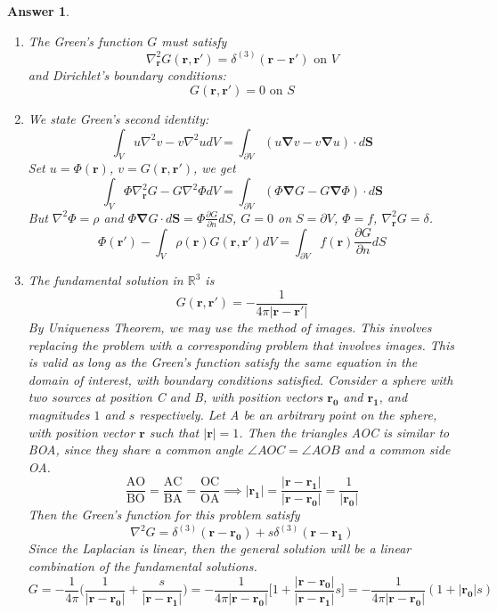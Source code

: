 \documentclass[a4paper]{article}
\newtheorem{ans}{Answer}[section]
\theoremstyle{new}
\begin{document}
\begin{ans}\leavevmode
\begin{enumerate}[label=(\alph*)]
\item The Green's function $G$ must satisfy
$$\nabla_{\mathbf{r}}^2G(\mathbf{r},\mathbf{r'})=\delta^{(3)}(\mathbf{r}-\mathbf{r'})\text{ on }V$$
and Dirichlet's boundary conditions:
$$G(\mathbf{r},\mathbf{r'})=0\text{ on }S$$
\item We state Green's second identity:
$$\int_Vu\nabla^2v-v\nabla^2udV=\int_{\partial V}(u\boldsymbol{\nabla}v-v\boldsymbol{\nabla}u)\cdot d\mathbf{S}$$
Set $u=\Phi(\mathbf{r})$, $v=G(\mathbf{r},\mathbf{r'})$, we get
$$\int_V\Phi\nabla_{\mathbf{r}}^2G-G\nabla^2\Phi dV=\int_{\partial V}(\Phi\boldsymbol{\nabla}G-G\boldsymbol{\nabla}\Phi)\cdot d\mathbf{S}$$
But $\nabla^2\Phi=\rho$ and $\Phi\boldsymbol{\nabla}G\cdot d\mathbf{S}=\Phi\frac{\partial G}{\partial n}dS$, $G=0$ on $S=\partial V$, $\Phi=f$, $\nabla_{\mathbf{r}}^2G=\delta$.
$$\Phi(\mathbf{r'})-\int_V\rho(\mathbf{r})G(\mathbf{r},\mathbf{r'})dV=\int_{\partial V}f(\mathbf{r})\frac{\partial G}{\partial n}dS$$
\item The fundamental solution in $\mathbb{R}^3$ is $$G(\mathbf{r},\mathbf{r'})=-\frac{1}{4\pi|\mathbf{r}-\mathbf{r'}|}$$
By Uniqueness Theorem, we may use the method of images. This involves replacing the problem with a corresponding problem that involves images. This is valid as long as the Green's function satisfy the same equation in the domain of interest, with boundary conditions satisfied. Consider a sphere with two sources at position C and B, with position vectors $\mathbf{r_0}$ and $\mathbf{r_1}$, and magnitudes $1$ and $s$ respectively. Let A be an arbitrary point on the sphere, with position vector $\mathbf{r}$ such that $|\mathbf{r}|=1$. Then the triangles AOC is similar to BOA, since they share a common angle $\angle AOC=\angle AOB$ and a common side OA.
$$\frac{\text{AO}}{\text{BO}}=\frac{\text{AC}}{\text{BA}}=\frac{\text{OC}}{\text{OA}}\implies|\mathbf{r_1}|=\frac{|\mathbf{r}-\mathbf{r_1}|}{|\mathbf{r}-\mathbf{r_0}|}=\frac{1}{|\mathbf{r_0}|}$$
Then the Green's function for this problem satisfy
$$\nabla^2G=\delta^{(3)}(\mathbf{r}-\mathbf{r_0})+s\delta^{(3)}(\mathbf{r}-\mathbf{r_1})$$
Since the Laplacian is linear, then the general solution will be a linear combination of the fundamental solutions.
$$G=-\frac{1}{4\pi}\bigg(\frac{1}{|\mathbf{r}-\mathbf{r_0}|}+\frac{s}{|\mathbf{r}-\mathbf{r_1}|}\bigg)=-\frac{1}{4\pi|\mathbf{r}-\mathbf{r_0}|}\bigg[1+\frac{|\mathbf{r}-\mathbf{r_0}|}{|\mathbf{r}-\mathbf{r_1}|}s\bigg]=-\frac{1}{4\pi|\mathbf{r}-\mathbf{r_0}|}(1+|\mathbf{r_0}|s)$$

\end{enumerate}
\end{ans}
\end{document}
